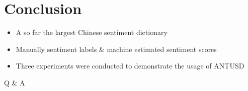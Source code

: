 \documentclass[compress]{beamer}
\begin{document}
\section{Conclusion}
    \begin{frame}{\secname}
        \begin{itemize}
            \item A so far the largest Chinese sentiment dictionary
            \item Manually sentiment labels \& machine estimated sentiment scores 
            \item Three experiments were conducted to demonstrate the usage of ANTUSD
        \end{itemize}
    \end{frame}

    \begin{frame}{}
        \begin{center}
            \huge
            Q \& A
        \end{center}
    \end{frame}
\end{document}
